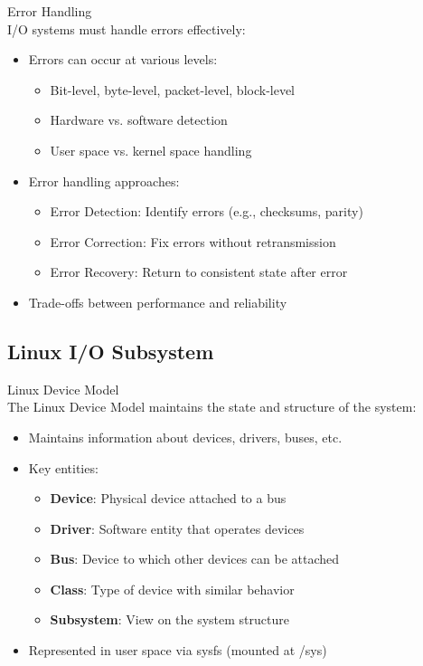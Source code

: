 \begin{definition}{Error Handling}\\
    I/O systems must handle errors effectively:
    \begin{itemize}
        \item Errors can occur at various levels:
            \begin{itemize}
                \item Bit-level, byte-level, packet-level, block-level
                \item Hardware vs. software detection
                \item User space vs. kernel space handling
            \end{itemize}
        \item Error handling approaches:
            \begin{itemize}
                \item Error Detection: Identify errors (e.g., checksums, parity)
                \item Error Correction: Fix errors without retransmission
                \item Error Recovery: Return to consistent state after error
            \end{itemize}
        \item Trade-offs between performance and reliability
    \end{itemize}
\end{definition}

\multend

\subsection{Linux I/O Subsystem}


\begin{definition}{Linux Device Model}\\
    The Linux Device Model maintains the state and structure of the system:
    \begin{itemize}
        \item Maintains information about devices, drivers, buses, etc.
        \item Key entities:
            \begin{itemize}
                \item \textbf{Device}: Physical device attached to a bus
                \item \textbf{Driver}: Software entity that operates devices
                \item \textbf{Bus}: Device to which other devices can be attached
                \item \textbf{Class}: Type of device with similar behavior
                \item \textbf{Subsystem}: View on the system structure
            \end{itemize}
        \item Represented in user space via sysfs (mounted at /sys)
    \end{itemize}
\end{definition}

